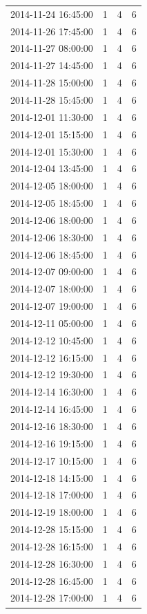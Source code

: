 \begin{tabular}{lrrr}
2014-11-24 16:45:00 & 1 & 4 & 6 \\
2014-11-26 17:45:00 & 1 & 4 & 6 \\
2014-11-27 08:00:00 & 1 & 4 & 6 \\
2014-11-27 14:45:00 & 1 & 4 & 6 \\
2014-11-28 15:00:00 & 1 & 4 & 6 \\
2014-11-28 15:45:00 & 1 & 4 & 6 \\
2014-12-01 11:30:00 & 1 & 4 & 6 \\
2014-12-01 15:15:00 & 1 & 4 & 6 \\
2014-12-01 15:30:00 & 1 & 4 & 6 \\
2014-12-04 13:45:00 & 1 & 4 & 6 \\
2014-12-05 18:00:00 & 1 & 4 & 6 \\
2014-12-05 18:45:00 & 1 & 4 & 6 \\
2014-12-06 18:00:00 & 1 & 4 & 6 \\
2014-12-06 18:30:00 & 1 & 4 & 6 \\
2014-12-06 18:45:00 & 1 & 4 & 6 \\
2014-12-07 09:00:00 & 1 & 4 & 6 \\
2014-12-07 18:00:00 & 1 & 4 & 6 \\
2014-12-07 19:00:00 & 1 & 4 & 6 \\
2014-12-11 05:00:00 & 1 & 4 & 6 \\
2014-12-12 10:45:00 & 1 & 4 & 6 \\
2014-12-12 16:15:00 & 1 & 4 & 6 \\
2014-12-12 19:30:00 & 1 & 4 & 6 \\
2014-12-14 16:30:00 & 1 & 4 & 6 \\
2014-12-14 16:45:00 & 1 & 4 & 6 \\
2014-12-16 18:30:00 & 1 & 4 & 6 \\
2014-12-16 19:15:00 & 1 & 4 & 6 \\
2014-12-17 10:15:00 & 1 & 4 & 6 \\
2014-12-18 14:15:00 & 1 & 4 & 6 \\
2014-12-18 17:00:00 & 1 & 4 & 6 \\
2014-12-19 18:00:00 & 1 & 4 & 6 \\
2014-12-28 15:15:00 & 1 & 4 & 6 \\
2014-12-28 16:15:00 & 1 & 4 & 6 \\
2014-12-28 16:30:00 & 1 & 4 & 6 \\
2014-12-28 16:45:00 & 1 & 4 & 6 \\
2014-12-28 17:00:00 & 1 & 4 & 6 \\

\end{tabular}
